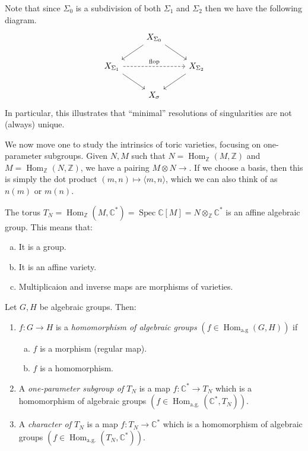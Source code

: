 \documentclass[a4paper,12pt]{amsart}
\newcommand{\ZZ}{\mathbb{Z}}
\newcommand{\CC}{\mathbb{C}}
\DeclareMathOperator{\Hom}{Hom}
\DeclareMathOperator{\Spec}{Spec}
\begin{document}
Note that since $\Sigma_0$ is a subdivision of both $\Sigma_1$ and $\Sigma_2$ then we have the following diagram.
$$\begin{tikzcd}
& X_{\Sigma_0} \arrow[dl] \arrow[dr]& \\
X_{\Sigma_1} \arrow[rr, dashed,"\text{flop}"] \arrow[dr]  &                           & X_{\Sigma_2} \arrow[dl]\\
&X_\sigma&             
\end{tikzcd}$$
In particular, this illustrates that ``minimal'' resolutions of singularities are not (always) unique.

We now move one to study the intrinsics of toric varieties, focusing on one-parameter subgroups. Given $N,M$ such that $N=\Hom_\ZZ(M,\ZZ)$ and$M=\Hom_\ZZ(N,\ZZ)$, we have a pairing $M\otimes N\rightarrow$. If we choose a basis, then this is simply the dot product $(m,n)\mapsto\langle m,n\rangle$, which we can also think of as $n(m)$ or $m(n)$. 

The torus $T_N=\Hom_\ZZ(M,\CC^*)=\Spec\CC[M]=N\otimes_\ZZ \CC^*$ is an affine algebraic group. This means that:
\begin{enumerate}[(a)]
	\item It is a group.
	\item It is an affine variety.
	\item Multiplicaion and inverse maps are morphisms of varieties.
\end{enumerate}

\begin{definition}
	Let $G,H$ be algebraic groups. Then:
	\begin{enumerate}[(1)]
		\item $f:G\rightarrow H$ is a \textit{homomorphism of algebraic groups} $(f\in\Hom_\text{a.g}(G,H))$ if
		\begin{enumerate}[(a)]
			\item $f$ is a morphism (regular map).
			\item $f$ is a homomorphism.
		\end{enumerate}
		\item A \textit{one-parameter subgroup of $T_N$} is a map $f:\CC^*\rightarrow T_N$ which is a homomorphism of algebraic groups $(f\in\Hom_\text{a.g.}(\CC^*,T_N))$.
		\item A \textit{character of $T_N$} is a map $f:T_N\rightarrow \CC^*$ which is a homomorphism of algebraic groups $(f\in\Hom_\text{a.g.}(T_N,\CC^*))$.
	\end{enumerate}
\end{definition}
\end{document}
